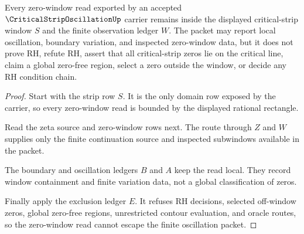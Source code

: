 \begin{theorem}
\label{thm:critical-strip-oscillation-zero-window-nonescape}
Every zero-window read exported by an accepted $\CriticalStripOscillationUp$ carrier remains inside the displayed critical-strip window $S$ and the finite observation ledger $W$. The packet may report local oscillation, boundary variation, and inspected zero-window data, but it does not prove RH, refute RH, assert that all critical-strip zeros lie on the critical line, claim a global zero-free region, select a zero outside the window, or decide any RH condition chain.
\end{theorem}
\begin{proof}
Start with the strip row $S$. It is the only domain row exposed by the carrier, so every zero-window read is bounded by the displayed rational rectangle.

Read the zeta source and zero-window rows next. The route through $Z$ and $W$ supplies only the finite continuation source and inspected subwindows available in the packet.

The boundary and oscillation ledgers $B$ and $A$ keep the read local. They record window containment and finite variation data, not a global classification of zeros.

Finally apply the exclusion ledger $E$. It refuses RH decisions, selected off-window zeros, global zero-free regions, unrestricted contour evaluation, and oracle routes, so the zero-window read cannot escape the finite oscillation packet.
\end{proof}




